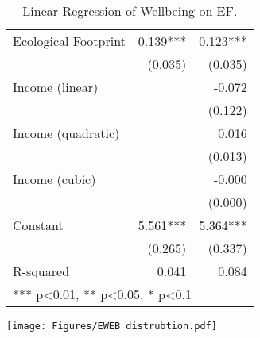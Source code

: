 \documentclass{article}
\begin{document}
\begin{table}[ht]
\begin{minipage}[t]{0.5\textwidth}
\caption{Linear Regression of Wellbeing on EF.}
\label{calculatingEWEB}
\begin{tabular}{lrr}
    \toprule
    Ecological Footprint & 0.139*** & 0.123*** \\
          & (0.035) & (0.035) \\
    Income (linear) && -0.072 \\
          &&(0.122) \\
    Income (quadratic) && 0.016 \\
          &&(0.013) \\
    Income (cubic) &&-0.000 \\
          && (0.000) \\
    Constant & 5.561*** &5.364*** \\
          & (0.265) & (0.337) \\
    \midrule
    R-squared & 0.041 & 0.084  \\
    \midrule
    \multicolumn{3}{l}{*** p<0.01, ** p<0.05, * p<0.1}\\
    \end{tabular}
\end{minipage}
\hfill
\begin{minipage}[t]{0.45\textwidth}
\label{fig:EWEBdis}
\texttt{[image: Figures/EWEB distrubtion.pdf]}
\end{minipage}
\end{table}
\end{document}
